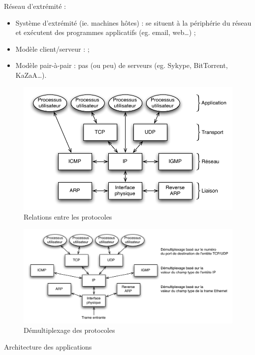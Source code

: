 \documentclass[11pt,english,french]{scrreprt}
\theoremstyle{remark}
\theoremstyle{definition}
\begin{document}
Réseau d'extrémité : \begin{itemize}
	\item Système d'extrémité (ie. machines hôtes) : se situent à la périphérie du réseau et exécutent des programmes applicatifs (eg. email, web\dots) ;
	\item Modèle client/serveur : ;
	\item Modèle pair-à-pair : pas (ou peu) de serveurs (eg. Sykype, BitTorrent, KaZaA\dots).
\end{itemize}

\begin{figure}[h!]
	\center
	\includegraphics[scale=.75]{graphes/relations-protocoles}
	\caption{Relations entre les protocoles}
\end{figure}

\begin{figure}[h!]
	\center
	\includegraphics[scale=.75]{graphes/demux-protocoles}
	\caption{Démultiplexage des protocoles}
\end{figure}

Architecture des applications
\end{document}
